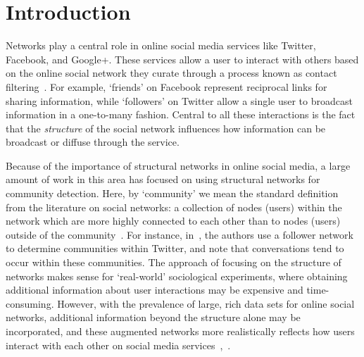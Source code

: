 \section{Introduction}

Networks play a central role in online social media services like Twitter, Facebook, and Google+. These services allow a user to interact with others based on the online social network they curate through a process known as contact filtering~\cite{cazabet2012automated}. For example, `friends' on Facebook represent reciprocal links for sharing information, while `followers' on Twitter allow a single user to broadcast information in a one-to-many fashion. Central to all these interactions is the fact that the \emph{structure} of the social network influences how information can be broadcast or diffuse through the service.

Because of the importance of structural networks in online social media, a large amount of work in this area has focused on using structural networks for community detection. Here, by `community' we mean the standard definition from the literature on social networks: a collection of nodes (users) within the network which are more highly connected to each other than to nodes (users) outside of the community~\cite{girvan2002a, newman2004finding}. For instance, in~\cite{java2009we}, the authors use a follower network to determine communities within Twitter, and note that conversations tend to occur within these communities. The approach of focusing on the structure of networks makes sense for `real-world' sociological experiments, where obtaining additional information about user interactions may be expensive and time-consuming. However, with the prevalence of large, rich data sets for online social networks, additional information beyond the structure alone may be incorporated, and these augmented networks more realistically reflects how users interact with each other on social media services~\cite{nguyen2011adaptive},~\cite{grabowicz2012social}.

